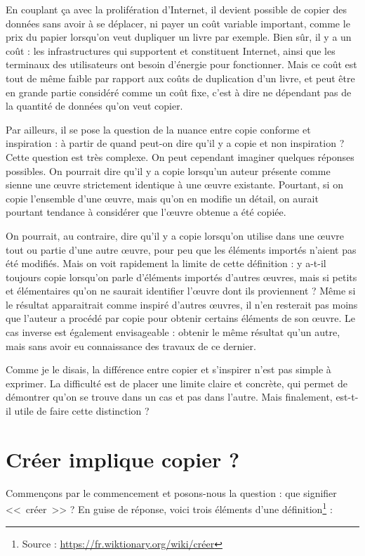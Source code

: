 En couplant ça avec la prolifération d'Internet, il devient possible de copier des données sans avoir à se déplacer, ni payer un coût variable important, comme le prix du papier lorsqu'on veut dupliquer un livre par exemple.
Bien sûr, il y a un coût : les infrastructures qui supportent et constituent Internet, ainsi que les terminaux des utilisateurs ont besoin d'énergie pour fonctionner.
Mais ce coût est tout de même faible par rapport aux coûts de duplication d'un livre, et peut être en grande partie considéré comme un coût fixe, c'est à dire ne dépendant pas de la quantité de données qu'on veut copier.

Par ailleurs, il se pose la question de la nuance entre copie conforme et inspiration : à partir de quand peut-on dire qu'il y a copie et non inspiration ?
Cette question est très complexe.
On peut cependant imaginer quelques réponses possibles.
On pourrait dire qu'il y a copie lorsqu'un auteur présente comme sienne une œuvre strictement identique à une œuvre existante.
Pourtant, si on copie l'ensemble d'une œuvre, mais qu'on en modifie un détail, on aurait pourtant tendance à considérer que l'œuvre obtenue a été copiée.

On pourrait, au contraire, dire qu'il y a copie lorsqu'on utilise dans une œuvre tout ou partie d'une autre œuvre, pour peu que les éléments importés n'aient pas été modifiés.
Mais on voit rapidement la limite de cette définition : y a-t-il toujours copie lorsqu'on parle d'éléments importés d'autres œuvres, mais si petits et élémentaires qu'on ne saurait identifier l'œuvre dont ils proviennent ?
Même si le résultat apparaitrait comme inspiré d'autres œuvres, il n'en resterait pas moins que l'auteur a procédé par copie pour obtenir certains éléments de son œuvre.
Le cas inverse est également envisageable : obtenir le même résultat qu'un autre, mais sans avoir eu connaissance des travaux de ce dernier.

Comme je le disais, la différence entre copier et s'inspirer n'est pas simple à exprimer.
La difficulté est de placer une limite claire et concrète, qui permet de démontrer qu'on se trouve dans un cas et pas dans l'autre.
Mais finalement, est-t-il utile de faire cette distinction ?

\section{Créer implique copier ?}

Commençons par le commencement et posons-nous la question : que signifier <<~créer~>> ?
En guise de réponse, voici trois éléments d'une définition\footnote{Source : \url{https://fr.wiktionary.org/wiki/créer}} :

